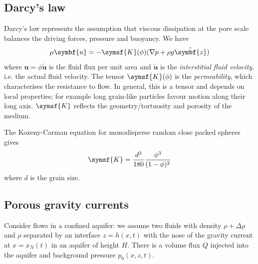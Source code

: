 \documentclass{jknotes}
\renewcommand{\u}{\symbf{u}}
\begin{document}
\subsection{Darcy's law}
Darcy's law represents the assumption that viscous dissipation at the pore
scale balances the driving forces, pressure and buoyancy. We have
\begin{equation}
	\mu \u = - \symsf{K}(\phi)(\nabla p + \rho g \hat{\symbf{z}})
\end{equation}
where $\u = \phi \tilde{\u}$ is the fluid flux per unit area and $\tilde{\u}$
is the \emph{interstitial fluid velocity}, i.e. the actual fluid velocity. The
tensor $\symsf{K}(\phi)$ is the \emph{permeability}, which characterises
the resistance to flow. In general, this is a tensor and depends on local
properties; for example long grain-like particles favour motion along their
long axis. $\symsf{K}$ reflects the geometry/tortuosity and porosity of the
medium. 
\begin{eg}
	The Kozeny-Carman equation for monodisperse random close packed spheres
	gives
	\begin{equation}
		\symsf{K} = \frac{d^2}{180} \frac{\phi^3}{(1-\phi)^2}
	\end{equation}
	where $d$ is the grain size.
\end{eg}

\subsection{Porous gravity currents}
Consider flows in a confined aquifer: we assume two fluids with density $\rho
+ \Delta \rho$ and $\rho$ separated by an interface $z=h(x,t)$ with the nose of
the gravity current at $x = x_N(t)$ in an aquifer of height $H$. There is a
volume flux $Q$ injected into the aquifer and background pressure $p_0(x,z,t)$.

\begin{center}
\end{center}
\end{document}
